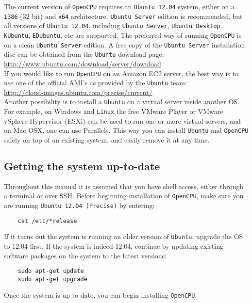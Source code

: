 \documentclass{scrartcl}
\begin{document}
\noindent The current version of \texttt{OpenCPU} requires an \texttt{Ubuntu
12.04} system, either on a \texttt{i386} (32 bit) and \texttt{x64} architecture.
\texttt{Ubuntu Server} edition is recommended, but all versions of
\texttt{Ubuntu 12.04}, including \texttt{Ubuntu Server}, \texttt{Ubuntu
Desktop}, \texttt{KUbuntu}, \texttt{EDUbuntu}, etc are supported. The preferred
way of running \texttt{OpenCPU} is on a clean \texttt{Ubuntu Server} edition. A
free copy of the \texttt{Ubuntu Server} installation disc can be obtained from
the \texttt{Ubuntu} download page: \\

\url{http://www.ubuntu.com/download/server/download} \\

\noindent If you would like to run \texttt{OpenCPU} on an Amazon EC2 server, the best way
is to use one of the official AMI's as provided by the \texttt{Ubuntu} team: \\

\url{http://cloud-images.ubuntu.com/precise/current/} \\

\noindent Another possibility is to install a \texttt{Ubuntu} on a virtual server inside
another OS. For example, on Windows and \texttt{Linux} the free VMware Player or VMware
vSphere Hypervisor (ESXi) can be used to run one or more virtual servers, and on
Mac OSX, one can use Parallels. This way you can install \texttt{Ubuntu} and \texttt{OpenCPU}
safely on top of an existing system, and easily remove it at any time.

\subsection{Getting the system up-to-date}

\noindent Throughout this manual it is assumed that you have shell access,
either through a terminal or over SSH. Before beginning installation of
\texttt{OpenCPU}, make sure you are running \texttt{Ubuntu 12.04 (Precise)} by
entering:

\begin{verbatim}
    cat /etc/*release
\end{verbatim}
If it turns out the system is running an older version of \texttt{Ubuntu}, upgrade the OS
to 12.04 first. If the system is indeed 12.04, continue by updating existing
software packages on the system to the latest versions:

\begin{verbatim}
    sudo apt-get update
    sudo apt-get upgrade
\end{verbatim}
Once the system is up to date, you can begin installing \texttt{OpenCPU}.
\end{document}
